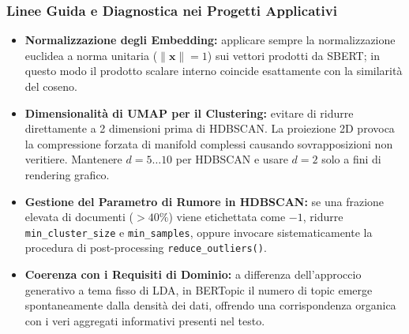 \subsubsection{Linee Guida e Diagnostica nei Progetti Applicativi}
\begin{itemize}
    \item \textbf{Normalizzazione degli Embedding:} applicare sempre la normalizzazione euclidea a norma unitaria ($\|\mathbf{x}\| = 1$) sui vettori prodotti da SBERT; in questo modo il prodotto scalare interno coincide esattamente con la similarità del coseno.
    \item \textbf{Dimensionalità di UMAP per il Clustering:} evitare di ridurre direttamente a 2 dimensioni prima di HDBSCAN. La proiezione 2D provoca la compressione forzata di manifold complessi causando sovrapposizioni non veritiere. Mantenere $d = 5 \dots 10$ per HDBSCAN e usare $d = 2$ solo a fini di rendering grafico.
    \item \textbf{Gestione del Parametro di Rumore in HDBSCAN:} se una frazione elevata di documenti ($> 40\%$) viene etichettata come $-1$, ridurre \texttt{min\_cluster\_size} e \texttt{min\_samples}, oppure invocare sistematicamente la procedura di post-processing \texttt{reduce\_outliers()}.
    \item \textbf{Coerenza con i Requisiti di Dominio:} a differenza dell'approccio generativo a tema fisso di LDA, in BERTopic il numero di topic emerge spontaneamente dalla densità dei dati, offrendo una corrispondenza organica con i veri aggregati informativi presenti nel testo.
\end{itemize}
